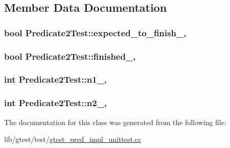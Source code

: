 \subsection{Member Data Documentation}
\hypertarget{class_predicate2_test_a56cf1f0f556addd9a62e0644dc1a86fc}{
\subsubsection[{expected\-\_\-to\-\_\-finish\-\_\-}]{\setlength{\rightskip}{0pt plus 5cm}bool Predicate2\-Test\-::expected\-\_\-to\-\_\-finish\-\_\-\hspace{0.3cm}{\ttfamily [static]}, {\ttfamily [protected]}}}\label{class_predicate2_test_a56cf1f0f556addd9a62e0644dc1a86fc}
\hypertarget{class_predicate2_test_a30f4ef76d3004253078e767e5c653b85}{
\subsubsection[{finished\-\_\-}]{\setlength{\rightskip}{0pt plus 5cm}bool Predicate2\-Test\-::finished\-\_\-\hspace{0.3cm}{\ttfamily [static]}, {\ttfamily [protected]}}}\label{class_predicate2_test_a30f4ef76d3004253078e767e5c653b85}
\hypertarget{class_predicate2_test_ac002d8e279b24e75906fd19973fc2170}{
\subsubsection[{n1\-\_\-}]{\setlength{\rightskip}{0pt plus 5cm}int Predicate2\-Test\-::n1\-\_\-\hspace{0.3cm}{\ttfamily [static]}, {\ttfamily [protected]}}}\label{class_predicate2_test_ac002d8e279b24e75906fd19973fc2170}
\hypertarget{class_predicate2_test_a9dbe5173570b9b911af2df889c287027}{
\subsubsection[{n2\-\_\-}]{\setlength{\rightskip}{0pt plus 5cm}int Predicate2\-Test\-::n2\-\_\-\hspace{0.3cm}{\ttfamily [static]}, {\ttfamily [protected]}}}\label{class_predicate2_test_a9dbe5173570b9b911af2df889c287027}


The documentation for this class was generated from the following file\-:\begin{DoxyCompactItemize}
\item 
lib/gtest/test/\hyperlink{gtest__pred__impl__unittest_8cc}{gtest\-\_\-pred\-\_\-impl\-\_\-unittest.\-cc}\end{DoxyCompactItemize}
